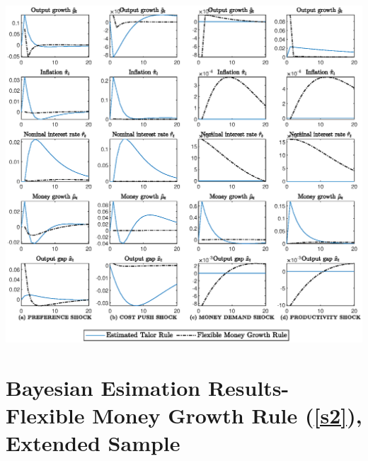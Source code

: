 \documentclass[11pt,preprint, authoryear]{elsarticle}
\let\origfigure\figure
\let\endorigfigure\endfigure
\renewenvironment{figure}[1][2] {
    \expandafter\origfigure\expandafter[H]
} {
    \endorigfigure
}
\numberwithin{equation}{section}
\numberwithin{figure}{section}
\numberwithin{table}{section}
\begin{document}
\begin{figure}
  \centering
    \hspace*{-2cm}  
  \includegraphics[width=1.2\textwidth]{code/final_irf_grid_extended.eps}
  \caption{Impulse responses to the indicated shock under the extended sample. Each column shows the percentage-point response of the indicated variable to a one-standard-deviation $\sigma_i$,for $i=a_t, z_t, u_t, e_t$, under the estimated taylor rule (\ref{s1}) and the flexible money growth rule (\ref{s2}).}
  \label{irf2}
\end{figure}

\renewcommand{\thesection}{Appendix C}

\hypertarget{bayesian-esimation-results--flexible-money-growth-rule-extended-sample}{%
\section{\texorpdfstring{Bayesian Esimation Results- Flexible Money
Growth Rule (\ref{s2}), Extended Sample
\label{cc}}{Bayesian Esimation Results- Flexible Money Growth Rule (), Extended Sample }}\label{bayesian-esimation-results--flexible-money-growth-rule-extended-sample}}
\end{document}
